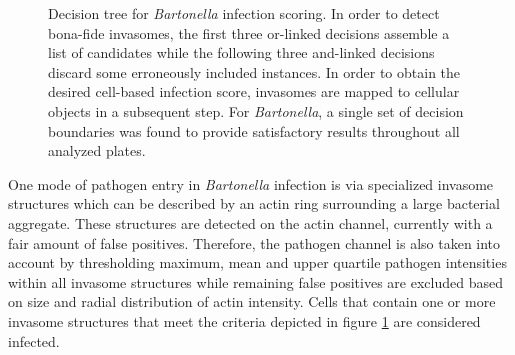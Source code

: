 \begin{figure}
  \centering
  \caption[Decision tree for \textit{Bartonella} infection scoring.]{Decision tree for \textit{Bartonella} infection scoring. In order to detect bona-fide invasomes, the first three or-linked decisions assemble a list of candidates while the following three and-linked decisions discard some erroneously included instances. In order to obtain the desired cell-based infection score, invasomes are mapped to cellular objects in a subsequent step. For \textit{Bartonella}, a single set of decision boundaries was found to provide satisfactory results throughout all analyzed plates.}
  \label{fig:dectree-bartonella}
\end{figure}

One mode of pathogen entry in \textit{Bartonella} infection is via specialized invasome structures which can be described by an actin ring surrounding a large bacterial aggregate. These structures are detected on the actin channel, currently with a fair amount of false positives. Therefore, the pathogen channel is also taken into account by thresholding maximum, mean and upper quartile pathogen intensities within all invasome structures while remaining false positives are excluded based on size and radial distribution of actin intensity. Cells that contain one or more invasome structures that meet the criteria depicted in figure \ref{fig:dectree-bartonella} are considered infected.

